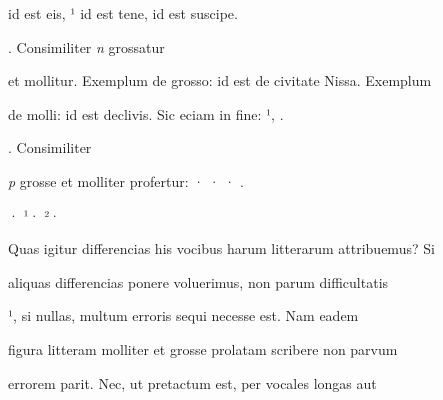 \splitlines


id est eis, ¹ id est tene,  id est suscipe.

\indentK {}. Consimiliter \textit{n} grossatur

\fulllines

et mollitur. Exemplum de grosso:  id est de civitate Nissa. Exemplum

\splitlines


de molli:  id est declivis. Sic eciam in fine: ¹, .


\indentK {}. Consimiliter


\fulllines

\textit{p} grosse et molliter profertur: · ·  · .


· ¹· ²·

Quas igitur differencias his vocibus harum litterarum attribuemus? Si

aliquas differencias ponere voluerimus, non parum difficultatis 


¹, si nullas, multum erroris sequi necesse est. Nam eadem 

figura litteram molliter et grosse prolatam scribere non parvum

errorem parit. Nec, ut pretactum est, per vocales longas aut

\newParkoszpage

